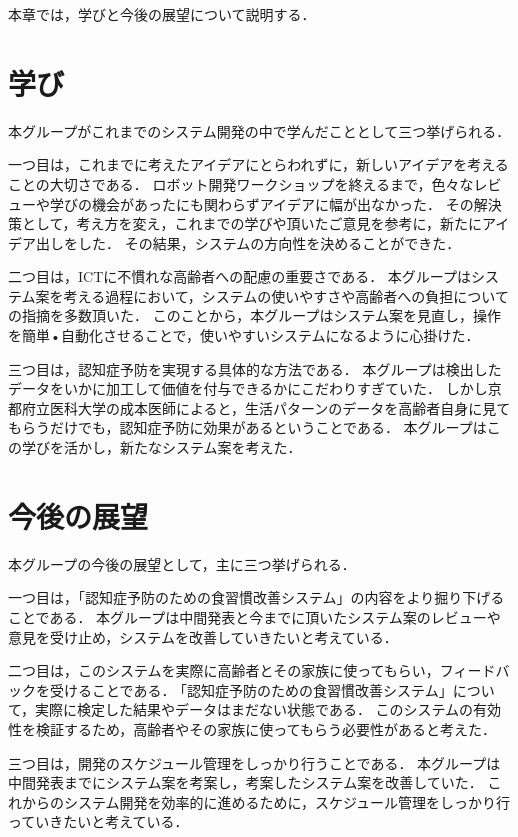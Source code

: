 \documentclass[../report]{subfiles}
\begin{document}
本章では，学びと今後の展望について説明する．

\section{学び}
本グループがこれまでのシステム開発の中で学んだこととして三つ挙げられる．

一つ目は，これまでに考えたアイデアにとらわれずに，新しいアイデアを考えることの大切さである．
ロボット開発ワークショップを終えるまで，色々なレビューや学びの機会があったにも関わらずアイデアに幅が出なかった．
その解決策として，考え方を変え，これまでの学びや頂いたご意見を参考に，新たにアイデア出しをした．
その結果，システムの方向性を決めることができた．

二つ目は，ICTに不慣れな高齢者への配慮の重要さである．
本グループはシステム案を考える過程において，システムの使いやすさや高齢者への負担についての指摘を多数頂いた．
このことから，本グループはシステム案を見直し，操作を簡単•自動化させることで，使いやすいシステムになるように心掛けた．

三つ目は，認知症予防を実現する具体的な方法である．
本グループは検出したデータをいかに加工して価値を付与できるかにこだわりすぎていた．
しかし京都府立医科大学の成本医師によると，生活パターンのデータを高齢者自身に見てもらうだけでも，認知症予防に効果があるということである．
本グループはこの学びを活かし，新たなシステム案を考えた．


\section{今後の展望}
本グループの今後の展望として，主に三つ挙げられる．

一つ目は，｢認知症予防のための食習慣改善システム」の内容をより掘り下げることである．
本グループは中間発表と今までに頂いたシステム案のレビューや意見を受け止め，システムを改善していきたいと考えている．

二つ目は，このシステムを実際に高齢者とその家族に使ってもらい，フィードバックを受けることである．
｢認知症予防のための食習慣改善システム」について，実際に検定した結果やデータはまだない状態である．
このシステムの有効性を検証するため，高齢者やその家族に使ってもらう必要性があると考えた．

三つ目は，開発のスケジュール管理をしっかり行うことである．
本グループは中間発表までにシステム案を考案し，考案したシステム案を改善していた．
これからのシステム開発を効率的に進めるために，スケジュール管理をしっかり行っていきたいと考えている．
\end{document}
